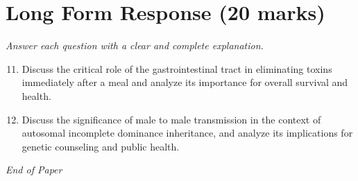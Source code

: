 \documentclass[12pt]{article}
\begin{document}
\section*{Long Form Response (20 marks)}
\textit{Answer each question with a clear and complete explanation.}
\begin{enumerate}[label=\arabic*.]
\setcounter{enumi}{10}
\item Discuss the critical role of the gastrointestinal tract in eliminating toxins immediately after a meal and analyze its importance for overall survival and health.
\item Discuss the significance of male to male transmission in the context of autosomal incomplete dominance inheritance, and analyze its implications for genetic counseling and public health.
\end{enumerate}

\vfill
\noindent\textit{End of Paper}
\end{document}
